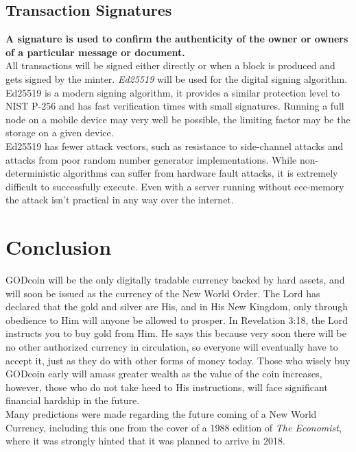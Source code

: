 \documentclass[12pt,a4paper]{article}
\begin{document}
  \subsection{Transaction Signatures}
  \textbf{A signature is used to confirm the authenticity of the owner or owners
  of a particular message or document.}\\

  All transactions will be signed either directly or when a block is produced
  and gets signed by the minter. \textit{Ed25519}\cite{ed25519} will be used for
  the digital signing algorithm. Ed25519 is a modern signing algorithm, it
  provides a similar protection level to NIST P-256 and has fast verification
  times with small signatures. Running a full node on a mobile device may very
  well be possible, the limiting factor may be the storage on a given device.\\

  Ed25519 has fewer attack vectors, such as resistance to side-channel attacks
  and attacks from poor random number generator implementations. While
  non-deterministic algorithms can suffer from hardware fault attacks, it is
  extremely difficult to successfully execute. Even with a server running
  without \gls{ecc-memory} the attack isn't practical in any way over the
  internet.

  \newpage
  \section{Conclusion}
  GODcoin will be the only digitally tradable currency backed by hard assets,
  and will soon be issued as the currency of the New World Order. The Lord has
  declared that the gold and silver are His, and in His New Kingdom, only
  through obedience to Him will anyone be allowed to prosper. In Revelation
  3:18, the Lord instructs you to buy gold from Him. He says this because very
  soon there will be no other authorized currency in circulation, so everyone
  will eventually have to accept it, just as they do with other forms of money
  today. Those who wisely buy GODcoin early will amass greater wealth as the
  value of the coin increases, however, those who do not take heed to His
  instructions, will face significant financial hardship in the future.\\

  Many predictions were made regarding the future coming of a New World
  Currency, including this one from the cover of a 1988 edition of \textit{The
  Economist}\cite{the-economist}, where it was strongly hinted that it was
  planned to arrive in 2018.\\
\end{document}
